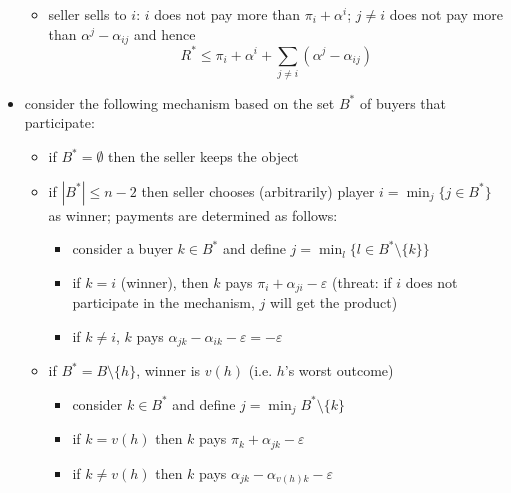 \documentclass[11pt,english]{beamer}
\newcommand{\ve}{\varepsilon}
\begin{document}
\begin{frame}[allowframebreaks]
\begin{itemize}
\begin{itemize}
\item seller sells to $i$: $i$ does not pay more than $\pi_{i}+\alpha^{i}$; $j \neq i$ does not pay more than $\alpha^{j} -\alpha_{ij}$ and hence
\label{sec-3-1-11-2}%
\begin{equation*}
R^*\leq \pi_{i}+\alpha^i+\sum_{j \neq i} (\alpha^{j}-\alpha_{ij})
\end{equation*}
\end{itemize} %

\item consider the following mechanism based on the set $B^{*}$ of buyers that participate:
\label{sec-3-1-12}%
\begin{itemize}

\item if $B^{*}= \emptyset$ then the seller keeps the object\\
\label{sec-3-1-12-1}%
\item if $|B^{*}| \leq n-2$ then seller chooses (arbitrarily) player $i = \min_{j} \{j \in B^{*}\}$ as winner; payments are determined as follows:
\label{sec-3-1-12-2}%
\begin{itemize}

\item consider a buyer $k \in B^{*}$ and define $j = \min_{l} \{l \in B^{*} \setminus \{k\} \}$\\
\label{sec-3-1-12-2-1}%
\item if $k=i$ (winner), then $k$ pays $\pi_{i}+\alpha_{ji}-\ve$ (threat: if $i$ does not participate in the mechanism, $j$ will get the product)\\
\label{sec-3-1-12-2-2}%
\item if $k \neq i$, $k$ pays $\alpha_{jk}-\alpha_{ik}-\ve=-\ve$\\
\label{sec-3-1-12-2-3}%
\end{itemize} %

\item if $B^{*}=B \setminus \{h\}$, winner is $v(h)$ (i.e. $h$'s worst outcome)
\label{sec-3-1-12-3}%
\begin{itemize}

\item consider $k \in B^{*}$ and define $j = \min_{j} B^{*} \setminus \{k\}$\\
\label{sec-3-1-12-3-1}%
\item if $k = v(h)$ then $k$ pays $\pi_{k}+\alpha_{jk}-\ve$\\
\label{sec-3-1-12-3-2}%
\item if $k \neq v(h)$ then $k$ pays $\alpha_{jk}-\alpha_{v(h)k}-\ve$\\
\label{sec-3-1-12-3-3}%
\end{itemize} %


\end{itemize}
\end{itemize}
\end{frame}
\end{document}
